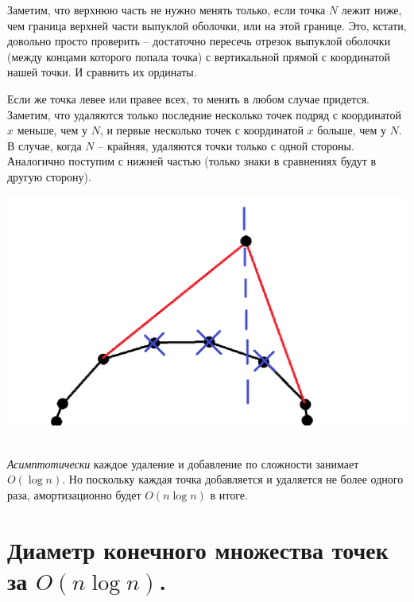Заметим, что верхнюю часть не нужно менять только, если точка $N$ лежит ниже, чем граница верхней части выпуклой оболочки, или на этой границе. Это, кстати, довольно просто проверить -- достаточно пересечь отрезок выпуклой оболочки (между концами которого попала точка) с вертикальной прямой с координатой нашей точки. И сравнить их ординаты.

Если же точка левее или правее всех, то менять в любом случае придется.\\

Заметим, что удаляются только последние несколько точек подряд с координатой $x$ меньше, чем у $N$, и первые несколько точек с координатой $x$ больше, чем у $N$. В случае, когда $N$ -- крайняя, удаляются точки только с одной стороны. \\

Аналогично поступим с нижней частью (только знаки в сравнениях будут в другую сторону).

\begin{minipage}[r]{0.3\linewidth} 
    \includegraphics[width=2\linewidth]{images/49_1.png}
\end{minipage} \\

\textit{Асимптотически} каждое удаление и добавление по сложности занимает $O(\log n)$. Но поскольку каждая точка добавляется и удаляется не более одного раза, амортизационно будет $O(n\log n)$ в итоге. 
\newpage{}

\section{Диаметр конечного множества точек за $O(n\log n)$.}

